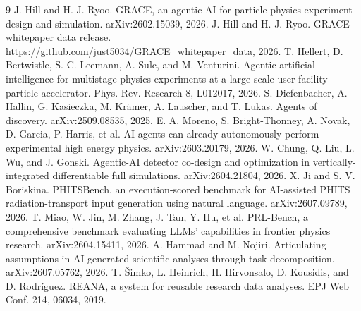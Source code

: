 \documentclass{article}
\begin{document}
\begin{thebibliography}{9}
\footnotesize
{} J. Hill and H. J. Ryoo. GRACE, an agentic AI for particle physics experiment design and simulation. arXiv:2602.15039, 2026.
 J. Hill and H. J. Ryoo. GRACE whitepaper data release. \url{https://github.com/just5034/GRACE_whitepaper_data}, 2026.
 T. Hellert, D. Bertwistle, S. C. Leemann, A. Sulc, and M. Venturini. Agentic artificial intelligence for multistage physics experiments at a large-scale user facility particle accelerator. Phys. Rev. Research 8, L012017, 2026.
 S. Diefenbacher, A. Hallin, G. Kasieczka, M. Kr\"amer, A. Lauscher, and T. Lukas. Agents of discovery. arXiv:2509.08535, 2025.
 E. A. Moreno, S. Bright-Thonney, A. Novak, D. Garcia, P. Harris, et al. AI agents can already autonomously perform experimental high energy physics. arXiv:2603.20179, 2026.
 W. Chung, Q. Liu, L. Wu, and J. Gonski. Agentic-AI detector co-design and optimization in vertically-integrated differentiable full simulations. arXiv:2604.21804, 2026.
 X. Ji and S. V. Boriskina. PHITSBench, an execution-scored benchmark for AI-assisted PHITS radiation-transport input generation using natural language. arXiv:2607.09789, 2026.
 T. Miao, W. Jin, M. Zhang, J. Tan, Y. Hu, et al. PRL-Bench, a comprehensive benchmark evaluating LLMs' capabilities in frontier physics research. arXiv:2604.15411, 2026.
 A. Hammad and M. Nojiri. Articulating assumptions in AI-generated scientific analyses through task decomposition. arXiv:2607.05762, 2026.
 T. \v{S}imko, L. Heinrich, H. Hirvonsalo, D. Kousidis, and D. Rodr\'iguez. REANA, a system for reusable research data analyses. EPJ Web Conf. 214, 06034, 2019.
\end{thebibliography}

\appendix
\end{document}
